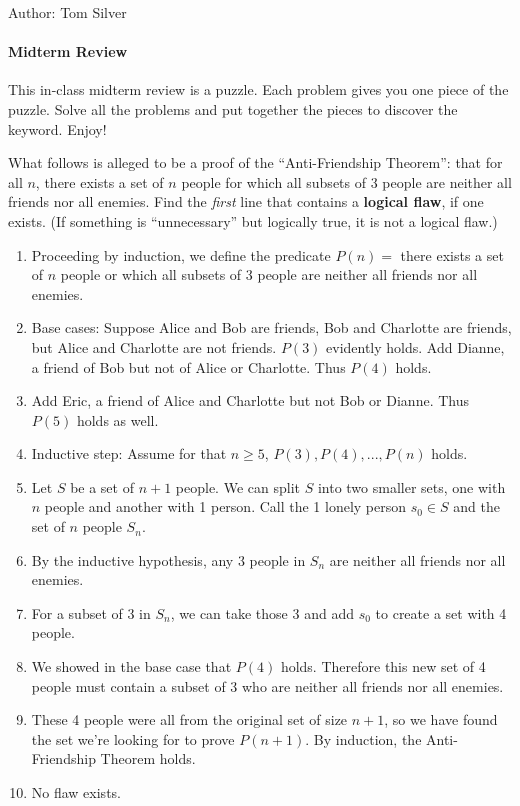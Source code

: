 \documentclass[solution, letterpaper]{cs20inclass}
\begin{document}

\noindent Author: Tom Silver%

\paragraph*{Midterm Review}
This in-class midterm review is a puzzle. Each problem gives you one piece of the puzzle. Solve all the problems and put together the pieces to discover the keyword. Enjoy!

\problem What follows is alleged to be a proof of the ``Anti-Friendship Theorem'': that for all $n$, there exists a set of $n$ people for which all subsets of 3 people are neither all friends nor all enemies. Find the \textit{first} line that contains a \textbf{logical flaw}, if one exists. (If something is ``unnecessary'' but logically true, it is not a logical flaw.)

\begin{enumerate}
\item Proceeding by induction, we define the predicate $P(n) = $ there exists a set of $n$ people or which all subsets of 3 people are neither all friends nor all enemies.
\item Base cases: Suppose Alice and Bob are friends, Bob and Charlotte are friends, but Alice and Charlotte are not friends. $P(3)$ evidently holds. Add Dianne, a friend of Bob but not of Alice or Charlotte. Thus $P(4)$ holds.
\item Add Eric, a friend of Alice and Charlotte but not Bob or Dianne. Thus $P(5)$ holds as well.
\item Inductive step: Assume for that $n \ge 5$, $P(3), P(4), ..., P(n)$ holds.
\item Let $S$ be a set of $n+1$ people. We can split $S$ into two smaller sets, one with $n$ people and another with 1 person. Call the 1 lonely person $s_0 \in S$ and the set of $n$ people $S_n$.
\item By the inductive hypothesis, any 3 people in $S_n$ are neither all friends nor all enemies.
\item For a subset of 3 in $S_n$, we can take those 3 and add $s_0$ to create a set with 4 people.
\item We showed in the base case that $P(4)$ holds. Therefore this new set of 4 people must contain a subset of 3 who are neither all friends nor all enemies.
\item These 4 people were all from the original set of size $n+1$, so we have found the set we're looking for to prove $P(n+1)$. By induction, the Anti-Friendship Theorem holds.
\item No flaw exists.
\end{enumerate}
\end{document}
